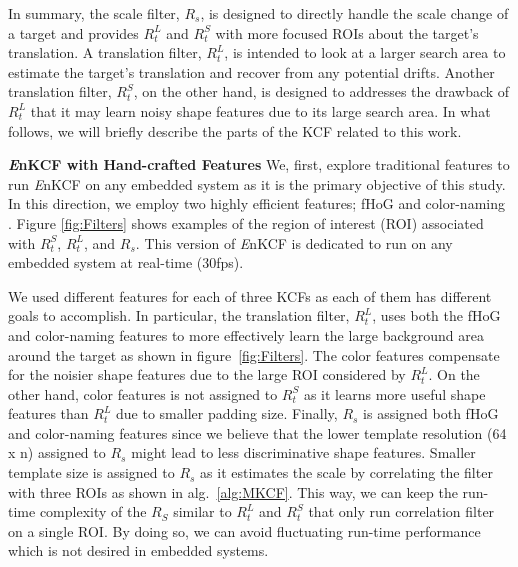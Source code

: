 \documentclass[10pt,twocolumn,letterpaper]{article}
\begin{document}
In summary, the scale filter, $R_{s}$, is designed to directly handle
the scale change of a target and provides $R_{t}^{L}$ and $R_{t}^{S}$
with more focused ROIs about the target's translation. A translation
filter, $R_{t}^{L}$, is intended to look at a larger search area to
estimate the target's translation and recover from any potential
drifts. Another translation filter, $R_{t}^{S}$, on the other hand, is
designed to addresses the drawback of $R_{t}^{L}$ that it may learn
noisy shape features due to its large search area. In what follows, we
will briefly describe the parts of the KCF related to this work.

\textbf{{\it E}nKCF with Hand-crafted Features}
We, first, explore traditional features to run  {\it E}nKCF on any embedded system as it is the primary
objective of this study. In this direction, we employ two highly efficient features; fHoG \cite{felzenszwalb2010object}
and color-naming \cite{li2014scale}. Figure \ref{fig:Filters} shows examples of the region of interest (ROI) associated with $R_{t}^{S}$,
$R_{t}^{L}$, and $R_{s}$. This version of {\it E}nKCF is dedicated to run
on any embedded system at real-time ($30$fps). 

We used different features for each of three KCFs as each of them 
has different goals to accomplish. In particular, the translation filter, $R_{t}^{L}$, 
uses both the fHoG \cite{felzenszwalb2010object}
and color-naming \cite{van2009learning} features to more effectively
learn the large background area around the target as shown in figure~\ref{fig:Filters}. The color features
compensate for the noisier shape features due to the large ROI considered by $R_{t}^{L}$.
On the other hand, color features is not assigned to $R_{t}^{S}$ as it learns more useful shape
features than $R_{t}^{L}$ due to smaller padding size. Finally, $R_{s}$ is assigned both fHoG 
and color-naming features since we believe that the lower template resolution (64 x n) assigned to
$R_{s}$ might lead to less discriminative shape features. Smaller template size is assigned to 
$R_{s}$ as it estimates the scale by correlating the filter with three ROIs as shown in alg.~\ref{alg:MKCF}. 
This way, we can keep the run-time complexity of the $R_{S}$ similar to $R_{t}^{L}$ and $R_{t}^{S}$ that 
only run correlation filter on a single ROI. By doing so, we can avoid fluctuating run-time performance 
which is not desired in embedded systems.
\end{document}
